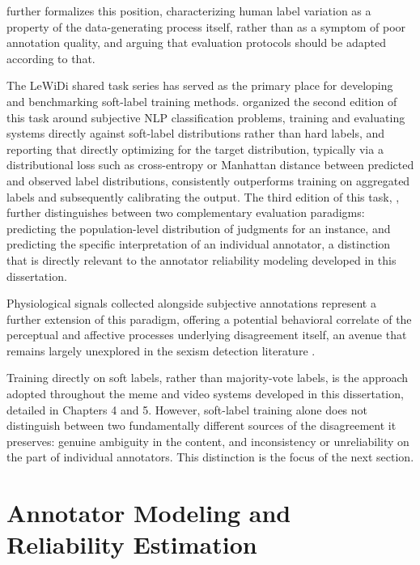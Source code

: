 \cite{plank2022problem} further formalizes this
position, characterizing human label variation as a property of the data-generating process
itself, rather than as a symptom of poor annotation quality, and arguing that evaluation
protocols should be adapted according to that.

The LeWiDi shared task series has served as the primary place for developing and
benchmarking soft-label training methods. \cite{leonardelli2023lewidi} organized the second
edition of this task around subjective NLP classification problems, training and evaluating
systems directly against soft-label distributions rather than hard labels, and reporting that
directly optimizing for the target distribution, typically via a distributional loss such as
cross-entropy or Manhattan distance between predicted and observed label distributions,
consistently outperforms training on aggregated labels and subsequently calibrating the
output. The third edition of this task, \cite{leonardelli2025lewidi}, further distinguishes
between two complementary evaluation paradigms: predicting the population-level distribution
of judgments for an instance, and predicting the specific interpretation of an
individual annotator, a distinction that is directly relevant to the annotator reliability
modeling developed in this dissertation.

Physiological signals collected alongside subjective annotations represent a further
extension of this paradigm, offering a potential behavioral correlate of the perceptual
and affective processes underlying disagreement itself, an avenue that remains largely
unexplored in the sexism detection literature \cite{exist2026overview}.

Training directly on soft labels, rather than majority-vote labels, is the approach adopted
throughout the meme and video systems developed in this dissertation, detailed in
Chapters 4 and 5. However, soft-label training alone does not distinguish between two
fundamentally different sources of the disagreement it preserves: genuine ambiguity in the
content, and inconsistency or unreliability on the part of individual annotators. This
distinction is the focus of the next section.



\section{Annotator Modeling and Reliability Estimation}\label{sec:annotator-modeling-reliability-estimation}

